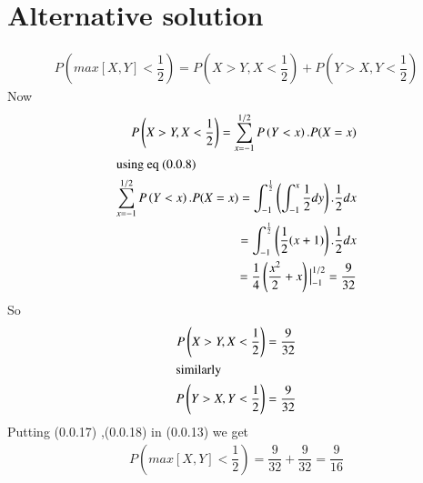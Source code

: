 \documentclass[journal,12pt,twocolumn]{IEEEtran}
\begin{document}
\section*{Alternative solution}
\begin{align}
P\left(max[X,Y] < \dfrac{1}{2}\right)=P \left(X>Y, X<\dfrac{1}{2} \right)+ P\left( Y>X, Y<\dfrac{1}{2}\right)
\end{align}
Now
\begin{align}
P \left(X>Y, X<\dfrac{1}{2} \right) = \sum_{x=-1}^{1/2} P\left(Y<x\right). P(X=x)\\
\intertext{using eq (0.0.8)}
\sum_{x=-1}^{1/2} P\left(Y<x\right). P(X=x)=\int_{-1}^{\frac{1}{2}} \left( \int_{-1}^{x} \dfrac{1}{2} dy \right). \dfrac{1}{2} dx\\
= \int_{-1}^{\frac{1}{2}} \left( \dfrac{1}{2}(x+1) \right). \dfrac{1}{2} dx\\
=\dfrac{1}{4}  \left( \dfrac{x^2}{2} + x \right) \big|_{-1}^{1/2}= \dfrac{9}{32}
\end{align}
So 
\begin{align}
P \left(X>Y, X<\dfrac{1}{2} \right)= \dfrac{9}{32}\\
\intertext{similarly} P\left( Y>X, Y<\dfrac{1}{2}\right)=\dfrac{9}{32}
\end{align}
Putting (0.0.17) ,(0.0.18) in (0.0.13) we get
\begin{align}
P\left(max[X,Y] < \dfrac{1}{2}\right)= \dfrac{9}{32} + \dfrac{9}{32}=\dfrac{9}{16}
\end{align}
\end{document}

